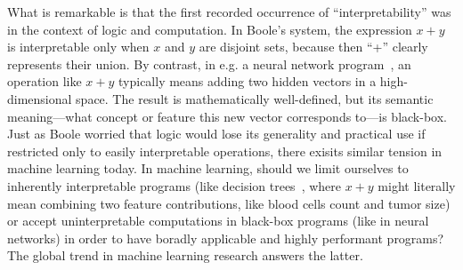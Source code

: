 What is remarkable is that the first recorded occurrence of ``interpretability'' was in the context of logic and computation. 
In Boole's system, the expression $x+y$ is interpretable only when $x$ and $y$ are disjoint sets, because then ``+'' clearly represents their union. 
By contrast, in e.g. a neural network program~\cite{perceptron}, an operation like $x+y$ typically means adding two hidden vectors in a high-dimensional space. 
The result is mathematically well-defined, but its semantic meaning—what concept or feature this new vector corresponds to—is black-box. 
Just as Boole worried that logic would lose its generality and practical use if restricted only to easily interpretable operations, there exisits similar tension in machine learning today.
In machine learning, should we limit ourselves to inherently interpretable programs (like decision trees~\cite{breiman1984classification}, where $x+y$ might literally mean combining two feature contributions, like blood cells count and tumor size) or accept uninterpretable computations in black-box programs (like in neural networks) in order to have boradly applicable and highly performant programs?
The global trend in machine learning research answers the latter.

